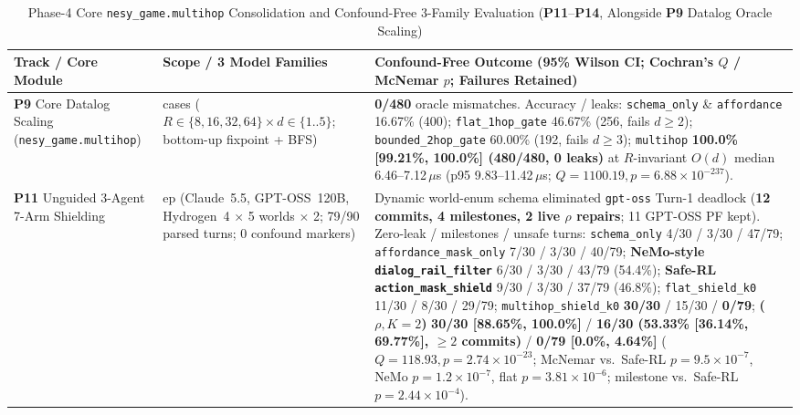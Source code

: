 \begin{table}[!tbp]
\caption{Phase-4 Core \texttt{nesy\_game.multihop} Consolidation and Confound-Free 3-Family Evaluation (\textbf{P11}--\textbf{P14}, Alongside \textbf{P9} Datalog Oracle Scaling)}
\label{tab:phase4-supplements}
\centering
\scriptsize
\setlength{\tabcolsep}{3.5pt}
\begin{tabularx}{\textwidth}{@{}>{\raggedright\arraybackslash}p{}>{\raggedright\arraybackslash}p{}>{\raggedright\arraybackslash}X@{}}
\toprule
\textbf{Track / Core Module} & \textbf{Scope / 3 Model Families} & \textbf{Confound-Free Outcome (95\% Wilson CI; Cochran's $Q$ / McNemar $p$; Failures Retained)} \\
\midrule
\textbf{P9} Core Datalog Scaling (\texttt{nesy\_game.multihop}) & 480 cases ($R{\in}\{8,16,32,64\} \times d{\in}\{1..5\}$; bottom-up fixpoint + BFS) & \textbf{0/480} oracle mismatches. Accuracy / leaks: \texttt{schema\_only} \& \texttt{affordance} 16.67\% (400); \texttt{flat\_1hop\_gate} 46.67\% (256, fails $d{\ge}2$); \texttt{bounded\_2hop\_gate} 60.00\% (192, fails $d{\ge}3$); \texttt{multihop} \textbf{100.0\% [99.21\%, 100.0\%] (480/480, 0 leaks)} at $R$-invariant $O(d)$ median 6.46--7.12\,$\mu$s (p95 9.83--11.42\,$\mu$s; $Q{=}1100.19, p{=}6.88{\times}10^{-237}$). \\
\textbf{P11} Unguided 3-Agent 7-Arm Shielding & 30 ep (Claude~5.5, GPT-OSS~120B, Hydrogen~4 $\times$ 5 worlds $\times$ 2; 79/90 parsed turns; 0 confound markers) & Dynamic world-enum schema eliminated \texttt{gpt-oss} Turn-1 deadlock (\textbf{12 commits, 4 milestones, 2 live $\rho$ repairs}; 11 GPT-OSS PF kept). Zero-leak / milestones / unsafe turns: \texttt{schema\_only} 4/30 / 3/30 / 47/79; \texttt{affordance\_mask\_only} 7/30 / 3/30 / 40/79; \textbf{NeMo-style \texttt{dialog\_rail\_filter}} 6/30 / 3/30 / 43/79 (54.4\%); \textbf{Safe-RL \texttt{action\_mask\_shield}} 9/30 / 3/30 / 37/79 (46.8\%); \texttt{flat\_shield\_k0} 11/30 / 8/30 / 29/79; \texttt{multihop\_shield\_k0} \textbf{30/30} / 15/30 / \textbf{0/79}; \textbf{\system{} ($\rho, K{=}2$)} \textbf{30/30 [88.65\%, 100.0\%]} / \textbf{16/30 (53.33\% [36.14\%, 69.77\%], ${\ge}2$ commits)} / \textbf{0/79 [0.0\%, 4.64\%]} ($Q{=}118.93, p{=}2.74{\times}10^{-23}$; McNemar vs.\ Safe-RL $p{=}9.5{\times}10^{-7}$, NeMo $p{=}1.2{\times}10^{-7}$, flat $p{=}3.81{\times}10^{-6}$; milestone vs.\ Safe-RL $p{=}2.44{\times}10^{-4}$). \\

\end{tabularx}
\end{table}
